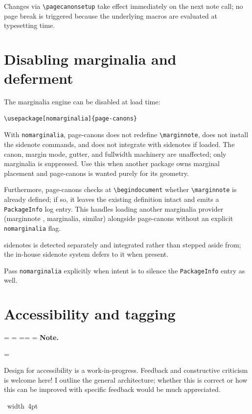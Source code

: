\documentclass[11pt, twoside, openany]{book}
\makeatletter
\newcommand{\pkg}[1]{\textsf{#1}}
\newcommand{\cmd}[1]{\texttt{\textbackslash #1}}
\newcommand*{\cns@tag@artifact@begin}{}
\newcommand*{\cns@tag@artifact@end}{}
\newenvironment{TodoNote}[1][]{%
  \par\addvspace{0.5\baselineskip plus 2pt}%
  \setbox\cns@box=\vbox\bgroup
    \hsize=\linewidth
    \advance\hsize -10pt
    \linewidth=\hsize \columnwidth=\hsize
    \parindent=\z@
    \noindent\textbf{\sffamily Note\cns@ifnotempty{#1}{ \textmd{(#1)}}.}%
    \par\nobreak
    \@afterindentfalse\@afterheading
    \leftskip=\cns@indent\relax
    \ignorespaces
}{%
  \par
  \egroup
  \vbox{\hbox{%
    \cns@tag@artifact@begin\vrule width 4pt\cns@tag@artifact@end
    \hskip 6pt\relax
    \box\cns@box
  }}%
  \par\addvspace{0.5\baselineskip plus 2pt}%
}
\makeatother
\begin{document}
Changes via \cmd{pagecanonsetup} take effect immediately on the next note call; no page break is triggered because the underlying macros are evaluated at typesetting time.

\section{Disabling marginalia and deferment}\label{sec:nomarginalia}

The marginalia engine can be disabled at load time:

\begin{verbatim}
\usepackage[nomarginalia]{page-canons}
\end{verbatim}

With \texttt{nomarginalia}, \pkg{page-canons} does not redefine \cmd{marginnote}, does not install the sidenote commands, and does not integrate with \pkg{sidenotes} if loaded. The canon, margin mode, gutter, and fullwidth machinery are unaffected; only marginalia is suppressed. Use this when another package owns marginal placement and \pkg{page-canons} is wanted purely for its geometry.

Furthermore, \pkg{page-canons} checks at \cmd{begin{document}} whether \cmd{marginnote} is already defined; if so, it leaves the existing definition intact and emits a \texttt{PackageInfo} log entry. This handles loading another marginalia provider (\pkg{marginnote} \cite{marginnote}, \pkg{marginalia}, similar) alongside \pkg{page-canons} without an explicit \texttt{nomarginalia} flag.

\pkg{sidenotes} \cite{sidenotes} is detected separately and integrated rather than stepped aside from; the in-house sidenote system defers to it when present.

Pass \texttt{nomarginalia} explicitly when intent is to silence the \texttt{PackageInfo} entry as well.

\section{Accessibility and tagging}\label{sec:tagging}

\begin{TodoNote}
    Design for accessibility is a work-in-progress. Feedback and constructive criticism is welcome here! I outline the general architecture; whether this is correct or how this can be improved with specific feedback would be much appreciated.
\end{TodoNote}
\end{document}
